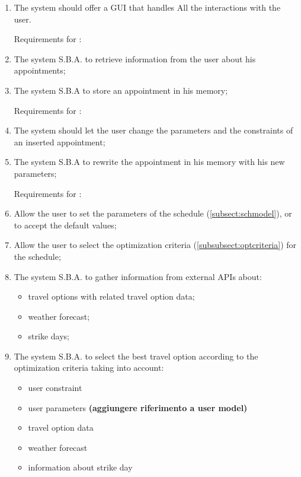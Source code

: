 \begin{enumerate}

\item The system should offer a GUI that handles All the interactions with the user.

Requirements for :

\renewcommand\labelenumi{\textbf{R\theenumi}}

\item The system S.B.A. to retrieve information from the user about his appointments; \label{req:R1}

\item The system S.B.A to store an appointment in his memory;


Requirements for :

\item The system should let the user change the parameters and the constraints of an inserted appointment; 

\item The system S.B.A to rewrite the appointment in his memory with his new parameters;

Requirements for :


\item Allow the user to set the parameters of the schedule (\ref{subsect:schmodel}), or to accept the default values;
 
\item Allow the user to select the optimization criteria (\ref{subsubsect:optcriteria}) for the schedule;

\item The system S.B.A. to gather information from external APIs about: 
\begin{itemize}
\item travel options with related travel option data;
\item weather forecast;
\item strike days;
\end{itemize}

\item The system S.B.A. to select the best travel option according to the optimization criteria taking into account:
\begin{itemize}
\item user constraint
\item user parameters \textbf{(aggiungere riferimento a user model)}
\item travel option data 
\item weather forecast
\item information about strike day
\end{itemize}


\end{enumerate}
